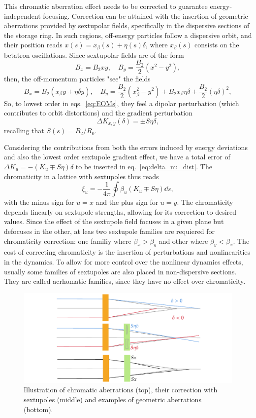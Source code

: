 This chromatic aberration effect needs to be corrected to guarantee energy-independent focusing. Correction can be attained with the insertion of geometric aberrations provided by sextupolar fields, specifically in the dispersive sections of the storage ring. In such regions, off-energy particles follow a dispersive orbit, and their position reads $x(s)=x_{\beta}(s)+\eta(s) \delta$, where $x_{\beta}(s)$ consists on the betatron oscillations. Since sextupolar fields are of the form
$$B_{x}=B_{2} x y, \quad B_{y}= \frac{B_{2}}{2}(x^{2}-y^{2}),$$
then, the off-momentum particles "see" the fields
$$B_{x}=B_{2}(x_\beta y + \eta \delta y), \quad B_{y}=\frac{B_{2}}{2}({x_\beta^{2}-y^{2}})+B_2 x_\beta \eta \delta + \frac{B_2}{2}(\eta \delta)^2,$$
So, to lowest order in eqs.~\eqref{eq:EOMs}, they feel a dipolar perturbation (which contributes to orbit distortions) and the gradient perturbation
$$\Delta K_{x,y}(\delta)=\pm S\eta \delta,$$
recalling that $S(s) = B_2 / R_0$.

Considering the contributions from both the errors induced by energy deviations and also the lowest order sextupole gradient effect, we have a total error of $\Delta K_u = -(K_u \mp S\eta)\delta$ to be inserted in eq.~\eqref{eq:delta_nu_dist}. The chromaticity in a lattice with sextupoles thus reads
\begin{equation}
    \xi_{u}=-\frac{1}{4\pi}\oint\beta_{u}(K_{u}\mp S\eta)\dd{s},
    \label{eq:chromaticity}
\end{equation}
with the minus sign for $u=x$ and the plus sign for $u=y$. The chromaticity depends linearly on sextupole strengths, allowing for its correction to desired values. Since the effect of the sextupole field focuses in a given plane but defocuses in the other, at leas two sextupole families are requiered for chromaticity correction: one familiy where $\beta_x > \beta_y$ and other where $\beta_y < \beta_x$. The cost of correcting chromaticity is the insertion of perturbations and nonlinearities in the dynamics. To allow for more control over the nonlinear dynamics effects, usually some families of sextupoles are also placed in non-dispersive sections. They are called acrhomatic families, since they have no effect over chromaticity.
\begin{figure}
    \centering
    \includegraphics[width=\textwidth]{Images/chromaticity.pdf}
    \caption[Illustration of chromatic aberrations, their correction with sextupoles and examples of geometric aberrations.]{Illustration of chromatic aberrations (top), their correction with sextupoles (middle) and examples of geometric aberrations (bottom).}
    \label{fig:chromaticity}
\end{figure}

